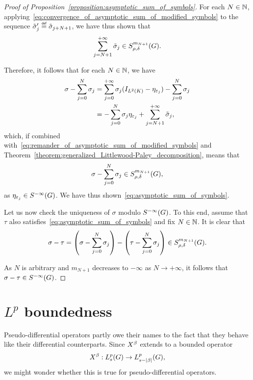 \begin{proof}[Proof of Proposition~\ref{proposition:asymptotic_sum_of_symbols}]
    For each $N \in \mathbb{N}$,
    applying~\eqref{eq:convergence_of_asymptotic_sum_of_modified_symbols} to the sequence $\tilde \sigma'_j \defeq \tilde \sigma_{j + N + 1}$,
    we have thus shown that
    \begin{align}
        \sum_{j = N + 1}^{+\infty} \tilde \sigma_j
        \in S^{m_{N + 1}}_{\rho, \delta}(G).
        \label{eq:remander_of_asymptotic_sum_of_modified_symbols}
    \end{align}

    Therefore,
    it follows that for each $N \in \mathbb{N}$,
    we have
    \begin{align*}
        \sigma - \sum_{j = 0}^N \sigma_j
        &= \sum_{j = 0}^{+\infty} \sigma_j ({I_{{L^{2} (K)}}} - \eta_{\varepsilon_j}) - \sum_{j = 0}^N \sigma_j\\
        &= -\sum_{j = 0}^N \sigma_j \eta_{\varepsilon_j} + \sum_{j = N + 1}^{+\infty} \tilde \sigma_j,
    \end{align*}
    which, if combined with~\eqref{eq:remander_of_asymptotic_sum_of_modified_symbols}
    and Theorem~\ref{theorem:generalized_Littlewood-Paley_decomposition},
    means that
    \begin{align*}
        \sigma - \sum_{j = 0}^N \sigma_j
        \in S^{m_{N + 1}}_{\rho, \delta}(G),
    \end{align*}
    as $\eta_{\varepsilon_j} \in {S^{-\infty} (G)}$.
    We have thus shown~\eqref{eq:asymptotic_sum_of_symbols}.

    Let us now check the uniqueness of $\sigma$ modulo ${S^{-\infty} (G)}$.
    To this end,
    assume that $\tau$ also satisfies~\eqref{eq:asymptotic_sum_of_symbols}
    and fix $N \in \mathbb{N}$.
    It is clear that
    \begin{align*}
        \sigma - \tau
        = \left(\sigma - \sum_{j = 0}^N \sigma_j\right) -
        \left(\tau - \sum_{j = 0}^N \sigma_j\right)
        \in S^{m_{N + 1}}_{\rho, \delta}(G).
    \end{align*}

    As $N$ is arbitrary
    and $m_{N + 1}$ decreases to $-\infty$ as $N \to +\infty$,
    it follows that $\sigma - \tau \in {S^{-\infty} (G)}$.
\end{proof}


\section{\texorpdfstring{$L^p$}{Lp} boundedness}

Pseudo-differential operators partly owe their names to the fact that they behave like their differential counterparts.
Since $\LeftDifferentialOperator \beta$ extends to a bounded operator
\begin{align*}
    \LeftDifferentialOperator \beta : \SobolevOrder p s \to \SobolevOrder p {s - \abs \beta},
\end{align*}
we might wonder whether this is true for pseudo-differential operators.

